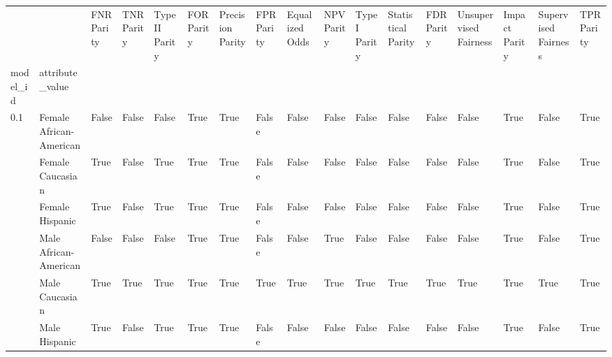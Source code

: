 \begin{tabular}{lllllllllllllllll}
\toprule
    &               &  FNR Parity &  TNR Parity &  TypeII Parity &  FOR Parity &  Precision Parity &  FPR Parity &  Equalized Odds &  NPV Parity &  TypeI Parity &  Statistical Parity &  FDR Parity &  Unsupervised Fairness &  Impact Parity &  Supervised Fairness &  TPR Parity \\
model\_id & attribute\_value &             &             &                &             &                   &             &                 &             &               &                     &             &                        &                &                      &             \\
\midrule
0.1 & Female African-American &       False &       False &          False &        True &              True &       False &           False &       False &         False &               False &       False &                  False &           True &                False &        True \\
    & Female Caucasian &        True &       False &           True &        True &              True &       False &           False &       False &         False &               False &       False &                  False &           True &                False &        True \\
    & Female Hispanic &        True &       False &           True &        True &              True &       False &           False &       False &         False &               False &       False &                  False &           True &                False &        True \\
    & Male African-American &       False &       False &          False &        True &              True &       False &           False &        True &         False &               False &       False &                  False &           True &                False &        True \\
    & Male Caucasian &        True &        True &           True &        True &              True &        True &            True &        True &          True &                True &        True &                   True &           True &                 True &        True \\
    & Male Hispanic &        True &       False &           True &        True &              True &       False &           False &       False &         False &               False &       False &                  False &           True &                False &        True \\

\end{tabular}
